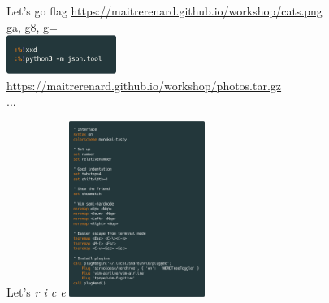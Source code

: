 \documentclass[10pt]{beamer}
\begin{document}
	\begin{frame}{Let's go flag}
		\center
		\href{https://maitrerenard.github.io/workshop/cats.png}{https://maitrerenard.github.io/workshop/cats.png}\\
		\vspace*{0.2in}%
		ga, g8, g=\\
		\vspace*{0.2in}%
		\vspace{1pt}
		\includegraphics[height=48]{img/tools.png}\\
		\center
		\href{https://maitrerenard.github.io/workshop/photos.tar.gz}{https://maitrerenard.github.io/workshop/photos.tar.gz}\\
		...
	\end{frame}

	\begin{frame}{Let's \textit{r i c e}}
		\center
		\includegraphics[height=216]{img/init-vim.png}
	\end{frame}
\end{document}
